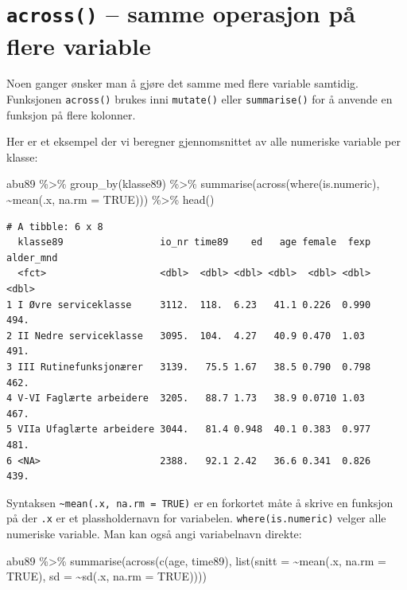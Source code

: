 \documentclass[
  norsk,
  letterpaper,
  DIV=11,
  numbers=noendperiod]{scrreprt}
\newenvironment{Shaded}{\begin{snugshade}}{\end{snugshade}}
\newcommand{\AttributeTok}[1]{\textcolor[rgb]{0.40,0.45,0.13}{#1}}
\newcommand{\ConstantTok}[1]{\textcolor[rgb]{0.56,0.35,0.01}{#1}}
\newcommand{\FunctionTok}[1]{\textcolor[rgb]{0.28,0.35,0.67}{#1}}
\newcommand{\NormalTok}[1]{\textcolor[rgb]{0.00,0.23,0.31}{#1}}
\newcommand{\SpecialCharTok}[1]{\textcolor[rgb]{0.37,0.37,0.37}{#1}}
\theoremstyle{definition}
\theoremstyle{remark}
\begin{document}
\section{\texorpdfstring{\texttt{across()} -- samme operasjon på flere
variable}{across() -- samme operasjon på flere variable}}\label{across-samme-operasjon-puxe5-flere-variable}

Noen ganger ønsker man å gjøre det samme med flere variable samtidig.
Funksjonen \texttt{across()} brukes inni \texttt{mutate()} eller
\texttt{summarise()} for å anvende en funksjon på flere kolonner.

Her er et eksempel der vi beregner gjennomsnittet av alle numeriske
variable per klasse:

\begin{Shaded}
\begin{Highlighting}[]
\NormalTok{abu89 }\SpecialCharTok{\%\textgreater{}\%}
  \FunctionTok{group\_by}\NormalTok{(klasse89) }\SpecialCharTok{\%\textgreater{}\%}
  \FunctionTok{summarise}\NormalTok{(}\FunctionTok{across}\NormalTok{(}\FunctionTok{where}\NormalTok{(is.numeric), }\SpecialCharTok{\textasciitilde{}}\FunctionTok{mean}\NormalTok{(.x, }\AttributeTok{na.rm =} \ConstantTok{TRUE}\NormalTok{))) }\SpecialCharTok{\%\textgreater{}\%}
  \FunctionTok{head}\NormalTok{()}
\end{Highlighting}
\end{Shaded}

\begin{verbatim}
# A tibble: 6 x 8
  klasse89                 io_nr time89    ed   age female  fexp alder_mnd
  <fct>                    <dbl>  <dbl> <dbl> <dbl>  <dbl> <dbl>     <dbl>
1 I Øvre serviceklasse     3112.  118.  6.23   41.1 0.226  0.990      494.
2 II Nedre serviceklasse   3095.  104.  4.27   40.9 0.470  1.03       491.
3 III Rutinefunksjonærer   3139.   75.5 1.67   38.5 0.790  0.798      462.
4 V-VI Faglærte arbeidere  3205.   88.7 1.73   38.9 0.0710 1.03       467.
5 VIIa Ufaglærte arbeidere 3044.   81.4 0.948  40.1 0.383  0.977      481.
6 <NA>                     2388.   92.1 2.42   36.6 0.341  0.826      439.
\end{verbatim}

Syntaksen \texttt{\textasciitilde{}mean(.x,\ na.rm\ =\ TRUE)} er en
forkortet måte å skrive en funksjon på der \texttt{.x} er et
plassholdernavn for variabelen. \texttt{where(is.numeric)} velger alle
numeriske variable. Man kan også angi variabelnavn direkte:

\begin{Shaded}
\begin{Highlighting}[]
\NormalTok{abu89 }\SpecialCharTok{\%\textgreater{}\%}
  \FunctionTok{summarise}\NormalTok{(}\FunctionTok{across}\NormalTok{(}\FunctionTok{c}\NormalTok{(age, time89),}
                   \FunctionTok{list}\NormalTok{(}\AttributeTok{snitt =} \SpecialCharTok{\textasciitilde{}}\FunctionTok{mean}\NormalTok{(.x, }\AttributeTok{na.rm =} \ConstantTok{TRUE}\NormalTok{),}
                        \AttributeTok{sd =} \SpecialCharTok{\textasciitilde{}}\FunctionTok{sd}\NormalTok{(.x, }\AttributeTok{na.rm =} \ConstantTok{TRUE}\NormalTok{))))}
\end{Highlighting}
\end{Shaded}
\end{document}
